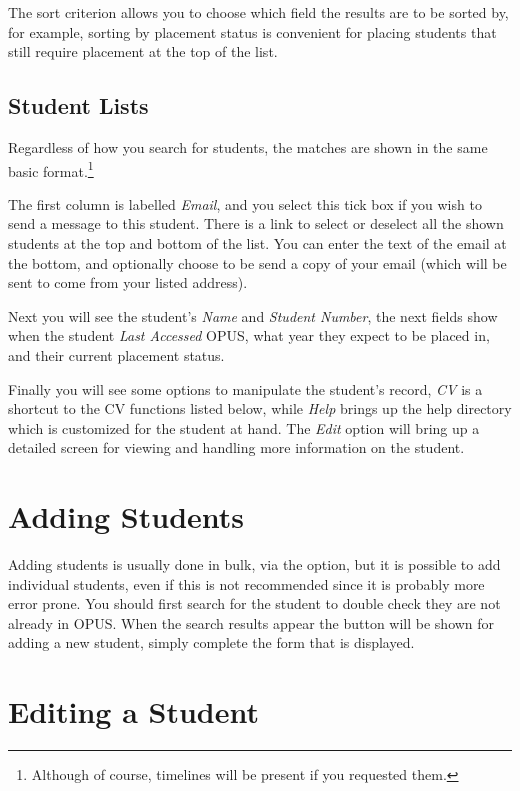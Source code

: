 \documentclass[12 pt]{book}
\begin{document}
The sort criterion allows you to choose which field the results are to be sorted
by, for example, sorting by placement status is convenient for placing students
that still require placement at the top of the list.

\subsection{Student Lists}

Regardless of how you search for students, the matches are shown in the same
basic format.\footnote{Although of course, timelines will be present if you
requested them.}%

The first column is labelled \emph{Email}, and you select this tick box if you
wish to send a message to this student. There is a link to select or deselect
all the shown students at the top and bottom of the list. You can enter the
text of the email at the bottom, and optionally choose to be send a copy of
your email (which will be sent to come from your listed address).

Next you will see the student's \emph{Name} and \emph{Student Number}, the next
fields show when the student \emph{Last Accessed} OPUS, what year they expect
to be placed in, and their current placement status.

Finally you will see some options to manipulate the student's record, \emph{CV} is a
shortcut to the CV functions listed below, while \emph{Help} brings up the
help directory which is customized for the student at hand. The \emph{Edit}
option will bring up a detailed screen for viewing and handling more 
information on the student.

\section{Adding Students}

Adding students is usually done in bulk, via the  option,
but it is possible to add individual students, even if this is not recommended
since it is probably more error prone. You should first search for the student
to double check they are not already in OPUS. When the search results appear
the  button will be shown for adding a new student, simply complete
the form that is displayed.

\section{Editing a Student}
\end{document}
